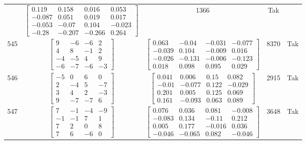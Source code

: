 \documentclass[a4paper,12pt]{article}
\begin{document}
\begin{tabular}{c c c c c}
&
$\begin{bmatrix} 0.119 & 0.158 & 0.016 & 0.053 \\ -0.087 & 0.051 & 0.019 & 0.017 \\ -0.053 & -0.07 & 0.104 & -0.023 \\ -0.28 & -0.207 & -0.266 & 0.264 \end{bmatrix}$
&
1366
&
Tak
\\
545
&
$\begin{bmatrix} 9 & -6 & -6 & 2 \\ 4 & 8 & -1 & 2 \\ -4 & -5 & 4 & 9 \\ -6 & -7 & -6 & -3 \end{bmatrix}$
&
$\begin{bmatrix} 0.063 & -0.04 & -0.031 & -0.077 \\ -0.039 & 0.104 & -0.009 & 0.016 \\ -0.026 & -0.131 & -0.006 & -0.123 \\ 0.018 & 0.098 & 0.095 & 0.029 \end{bmatrix}$
&
8370
&
Tak
\\
546
&
$\begin{bmatrix} -5 & 0 & 6 & 0 \\ 2 & -4 & 5 & -7 \\ 3 & 4 & 2 & -3 \\ 9 & -7 & -7 & 6 \end{bmatrix}$
&
$\begin{bmatrix} 0.041 & 0.006 & 0.15 & 0.082 \\ -0.01 & -0.077 & 0.122 & -0.029 \\ 0.201 & 0.005 & 0.125 & 0.069 \\ 0.161 & -0.093 & 0.063 & 0.089 \end{bmatrix}$
&
2915
&
Tak
\\
547
&
$\begin{bmatrix} 7 & -1 & -4 & -9 \\ -1 & -1 & 7 & 1 \\ 7 & 2 & 0 & 8 \\ 7 & 6 & -6 & 0 \end{bmatrix}$
&
$\begin{bmatrix} 0.076 & 0.036 & 0.081 & -0.008 \\ -0.083 & 0.134 & -0.11 & 0.212 \\ 0.005 & 0.177 & -0.016 & 0.036 \\ -0.046 & -0.065 & 0.082 & -0.046 \end{bmatrix}$
&
3648
&
Tak
\\

\end{tabular}
\end{document}
